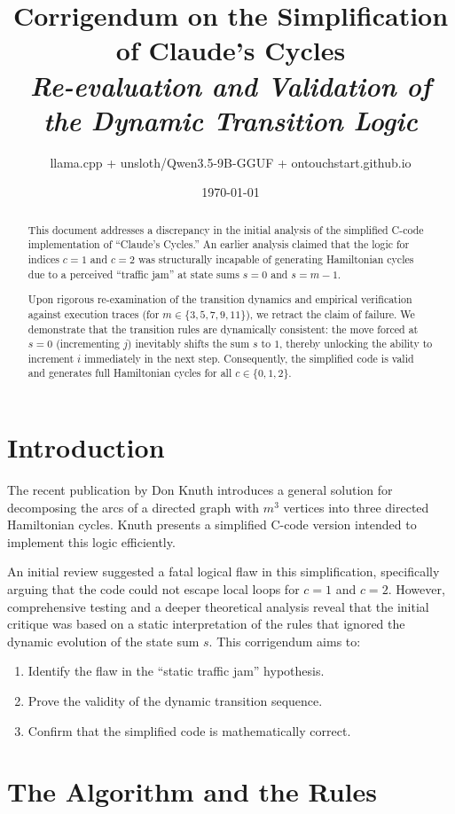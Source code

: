 \documentclass[10pt]{article}
\title{\textbf{Corrigendum on the Simplification of Claude's Cycles} \\ \textit{Re-evaluation and Validation of the Dynamic Transition Logic}}
\author{llama.cpp + unsloth/Qwen3.5-9B-GGUF + ontouchstart.github.io}
\date{\today}
\begin{document}
\maketitle

\begin{abstract}
This document addresses a discrepancy in the initial analysis of the simplified C-code implementation of ``Claude's Cycles.'' An earlier analysis claimed that the logic for indices $c=1$ and $c=2$ was structurally incapable of generating Hamiltonian cycles due to a perceived ``traffic jam'' at state sums $s=0$ and $s=m-1$. 

Upon rigorous re-examination of the transition dynamics and empirical verification against execution traces (for $m \in \{3, 5, 7, 9, 11\}$), we retract the claim of failure. We demonstrate that the transition rules are dynamically consistent: the move forced at $s=0$ (incrementing $j$) inevitably shifts the sum $s$ to $1$, thereby unlocking the ability to increment $i$ immediately in the next step. Consequently, the simplified code is valid and generates full Hamiltonian cycles for all $c \in \{0, 1, 2\}$.
\end{abstract}

\section{Introduction}
The recent publication by Don Knuth introduces a general solution for decomposing the arcs of a directed graph with $m^3$ vertices into three directed Hamiltonian cycles. Knuth presents a simplified C-code version intended to implement this logic efficiently.

An initial review suggested a fatal logical flaw in this simplification, specifically arguing that the code could not escape local loops for $c=1$ and $c=2$. However, comprehensive testing and a deeper theoretical analysis reveal that the initial critique was based on a static interpretation of the rules that ignored the dynamic evolution of the state sum $s$. This corrigendum aims to:
\begin{enumerate}
    \item Identify the flaw in the ``static traffic jam'' hypothesis.
    \item Prove the validity of the dynamic transition sequence.
    \item Confirm that the simplified code is mathematically correct.
\end{enumerate}

\section{The Algorithm and the Rules}
\end{document}
